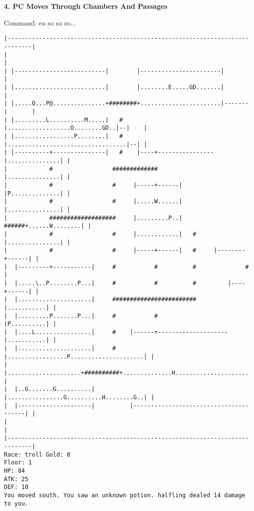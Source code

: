 \documentclass[11pt]{article}
\theoremstyle{plain}
\begin{document}
\textbf{4. PC Moves Through Chambers And Passages}

Command: ea so so so...
\begin{Verbatim}[fontsize=\small]
|-----------------------------------------------------------------------------|
|                                                                             |
| |--------------------------|        |-----------------------|               |
| |..........................|        |........E.....GD.......|               |
| |.....O...P@...............+########+.......................|-------|       |
| |.........L..........M.....|   #    |..................O........GD..|--|    |
| |.................P........|   #    |..................................|--| |
| |----------+---------------|   #    |----+----------------|...............| |
|            #                 #############                |...............| |
|            #                 #     |-----+------|         |P..............| |
|            #                 #     |.....W......|         |...............| |
|            ###################     |.........P..|   ######+......W........| |
|            #                 #     |............|   #     |...............| |
|            #                 #     |-----+------|   #     |--------+------| |
|  |---------+-----------|     #           #          #              #        |
|  |.....\..P........P...|     #           #          #         |----+------| |
|  |.....................|     ########################         |...........| |
|  |.........P.......P...|     #           #                    |P..........| |
|  |....L................|     #    |------+--------------------|...........| |
|  |.....................|     #    |.................P.....................| |
|  |.....................+##########+..............H........................| |
|  |..G.......G..........|          |................G..........H........G..| |
|  |---------------------|          |---------------------------------------| |
|                                                                             |
|-----------------------------------------------------------------------------|
Race: troll Gold: 0                                                    Floor: 1
HP: 84
ATK: 25
DEF: 10
You moved south. You saw an unknown potion. halfling dealed 14 damage to you. 
\end{Verbatim}
\end{document}
